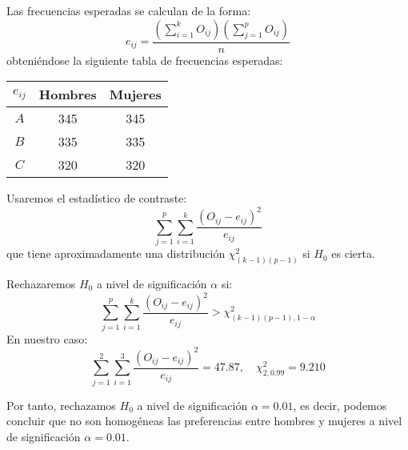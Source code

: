 \begin{example}
    Las frecuencias esperadas se calculan de la forma:
    $$e_{ij} = \frac{(\sum_{i=1}^k O_{ij})(\sum_{j=1}^p O_{ij})}{n}$$
    obteniéndose la siguiente tabla de frecuencias esperadas:
    \begin{center}
        \begin{tabular}{| c | c c |}
            \hline
            $e_{ij}$ & Hombres & Mujeres \\
            \hline
            $A$      & 345     & 345     \\
            $B$      & 335     & 335     \\
            $C$      & 320     & 320     \\
            \hline
        \end{tabular}
    \end{center}

    Usaremos el estadístico de contraste:
    $$\sum_{j=1}^p \sum_{i=1}^k \frac{(O_{ij}-e_{ij})^2}{e_{ij}}$$
    que tiene aproximadamente una distribución $\chi^2_{(k-1)(p-1)}$ si $H_0$ es cierta.

    Rechazaremos $H_0$ a nivel de significación $\alpha$ si:
    $$\sum_{j=1}^p \sum_{i=1}^k \frac{(O_{ij}-e_{ij})^2}{e_{ij}} > \chi^2_{(k-1)(p-1), 1-\alpha}$$
    En nuestro caso:
    $$\sum_{j=1}^2 \sum_{i=1}^3 \frac{(O_{ij}-e_{ij})^2}{e_{ij}} = 47.87, \quad \chi^2_{2, 0.99} = 9.210$$

    Por tanto, rechazamos $H_0$ a nivel de significación $\alpha = 0.01$, es decir, podemos concluir que no son homogéneas las preferencias entre hombres y mujeres a nivel de significación $\alpha = 0.01$.
\end{example}

